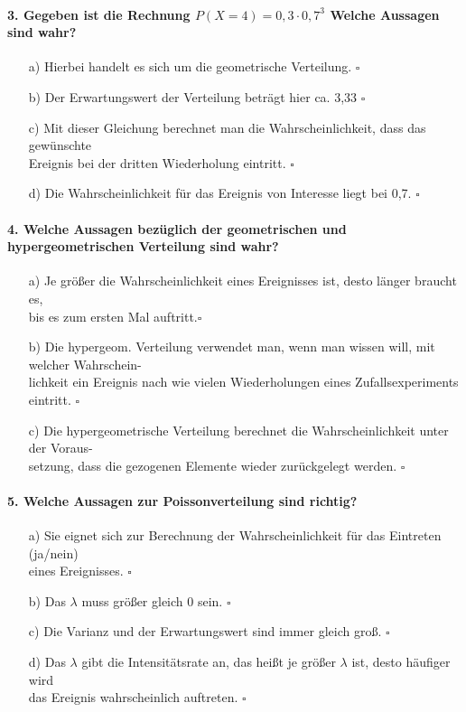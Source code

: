 \documentclass[a4paper]{article}
\begin{document}
\paragraph{3. Gegeben ist die Rechnung $P(X=4) = 0,3 \cdot 0,7^3$ Welche Aussagen sind wahr?}
\begin{itemize}
    \item[a)] Hierbei handelt es sich um die geometrische Verteilung. \hfill $\square$
    \item[b)] Der Erwartungswert der Verteilung beträgt hier ca. 3,33 \hfill $\square$
    \item[c)] Mit dieser Gleichung berechnet man die Wahrscheinlichkeit, dass das gewünschte\\ Ereignis bei der dritten Wiederholung eintritt. \hfill $\square$
    \item[d)] Die Wahrscheinlichkeit für das Ereignis von Interesse liegt bei 0,7. \hfill $\square$
\end{itemize}
    
\paragraph{4. Welche Aussagen bezüglich der geometrischen und hypergeometrischen Verteilung sind wahr?}
\begin{itemize}
    \item[a)] Je größer die Wahrscheinlichkeit eines Ereignisses ist, desto länger braucht es, \\ bis es zum ersten Mal auftritt.\hfill $\square$
    \item[b)] Die hypergeom. Verteilung verwendet man, wenn man wissen will, mit welcher Wahrschein-\\lichkeit ein Ereignis nach wie vielen Wiederholungen eines Zufallsexperiments eintritt. \hfill $\square$
    \item[c)] Die hypergeometrische Verteilung berechnet die Wahrscheinlichkeit unter der Voraus-\\setzung, dass die gezogenen Elemente wieder zurückgelegt werden. \hfill $\square$
\end{itemize}
    
\paragraph{5. Welche Aussagen zur Poissonverteilung sind richtig?}
\begin{itemize}
    \item[a)] Sie eignet sich zur Berechnung der Wahrscheinlichkeit für das Eintreten (ja/nein)\\eines Ereignisses. \hfill $\square$
    \item[b)] Das $\lambda$ muss größer gleich 0 sein. \hfill $\square$
    \item[c)] Die Varianz und der Erwartungswert sind immer gleich groß. \hfill $\square$
    \item[d)] Das $\lambda$ gibt die Intensitätsrate an, das heißt je größer $\lambda$ ist, desto häufiger wird \\das Ereignis wahrscheinlich auftreten. \hfill $\square$
\end{itemize}
\end{document}
